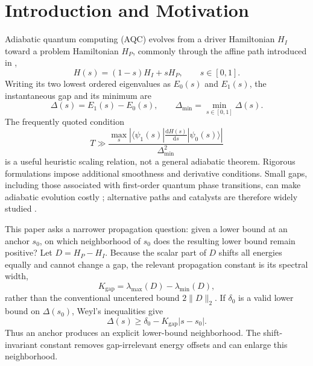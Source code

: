 \documentclass[11pt, a4paper]{article}
\newcommand{\dd}{\mathrm{d}}
\newcommand{\opvalue}[3]{\langle #1 | #2 | #3 \rangle}
\newcommand{\norm}[1]{\| #1 \|}
\begin{document}
\section{Introduction and Motivation}
Adiabatic quantum computing (AQC) evolves from a driver Hamiltonian $H_I$ toward a problem Hamiltonian $H_P$, commonly through the affine path introduced in \cite{farhi2000quantumcomputationadiabaticevolution},
\begin{equation}
H(s)=(1-s)H_I+sH_P, \qquad s\in[0,1].
\end{equation}
Writing its two lowest ordered eigenvalues as $E_0(s)$ and $E_1(s)$, the instantaneous gap and its minimum are
\begin{equation}
\Delta(s)=E_1(s)-E_0(s),
\qquad
\Delta_{\min}=\min_{s\in[0,1]}\Delta(s).
\end{equation}
The frequently quoted condition
\begin{equation}
T \gg \frac{\max_s \left| \opvalue{\psi_1(s)}{\frac{\dd H(s)}{\dd s}}{\psi_0(s)} \right|}{\Delta_{\min}^2}
\end{equation}
is a useful heuristic scaling relation, not a general adiabatic theorem. Rigorous formulations impose additional smoothness and derivative conditions. Small gaps, including those associated with first-order quantum phase transitions, can make adiabatic evolution costly \cite{smelyanskiy2002dynamicsquantumadiabaticevolution,PhysRevResearch.5.043236}; alternative paths and catalysts are therefore widely studied \cite{PhysRevResearch.5.043236,hnzj-j7kt,farhi2000quantumcomputationadiabaticevolution}.

This paper asks a narrower propagation question: given a lower bound at an anchor $s_0$, on which neighborhood of $s_0$ does the resulting lower bound remain positive? Let $D=H_P-H_I$. Because the scalar part of $D$ shifts all energies equally and cannot change a gap, the relevant propagation constant is its spectral width,
\begin{equation}
K_{\mathrm{gap}}=\lambda_{\max}(D)-\lambda_{\min}(D),
\end{equation}
rather than the conventional uncentered bound $2\norm{D}_2$. If $\delta_0$ is a valid lower bound on $\Delta(s_0)$, Weyl's inequalities give
\begin{equation}
\Delta(s)\ge\delta_0-K_{\mathrm{gap}}|s-s_0|.
\end{equation}
Thus an anchor produces an explicit lower-bound neighborhood. The shift-invariant constant removes gap-irrelevant energy offsets and can enlarge this neighborhood.
\end{document}
